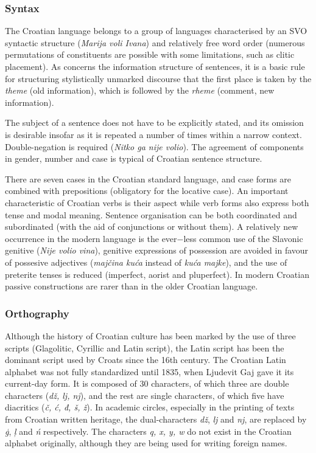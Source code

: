 \begin{multicols}{2}
\subsubsection{Syntax}

The Croatian language belongs to a group of languages characterised by an SVO syntactic structure (\emph{Marija voli Ivana}) and relatively free word order (numerous permutations of constituents are possible with some limitations, such as clitic placement). As concerns the information structure of sentences, it is a basic rule for structuring stylistically unmarked discourse that the first place is taken by the \emph{theme} (old information), which is followed by the \emph{rheme} (comment, new information).

The subject of a sentence does not have to be explicitly stated, and its omission is desirable insofar as it is repeated a number of times within a narrow context. Double-negation is required (\emph{Nitko ga nije volio}). The agreement of components in gender, number and case is typical of Croatian sentence structure.

There are seven cases in the Croatian standard language, and case forms are combined with prepositions (obligatory for the locative case). An important characteristic of Croatian verbs is their aspect while verb forms also express both tense and modal meaning. Sentence organisation can be both coordinated and subordinated (with the aid of conjunctions or without them). A relatively new occurrence in the modern language is the ever$-$less common use of the Slavonic genitive (\emph{Nije volio vina}), genitive expressions of possession are avoided in favour of possesive adjectives (\emph{majčina kuća} instead of \emph{kuća majke}), and the use of preterite tenses is reduced (imperfect, aorist and pluperfect). In modern Croatian passive constructions are rarer than in the older Croatian language.

\subsubsection{Orthography}

Although the history of Croatian culture has been marked by the use of three scripts (Glagolitic, Cyrillic and Latin script), the Latin script has been the dominant script used by Croats since the 16th century. The Croatian Latin alphabet was not fully standardized until 1835, when Ljudevit Gaj gave it its current-day form. It is composed of 30 characters, of which three are double characters (\emph{dž, lj, nj}), and the rest are single characters, of which five have diacritics (\emph{č, ć, đ, š, ž}). In academic circles, especially in the printing of texts from Croatian written heritage, the dual-characters \emph{dž}, \emph{lj} and \emph{nj}, are replaced by \emph{ģ}, \emph{ļ} and \emph{ń} respectively. The characters \emph{q, x, y, w} do not exist in the Croatian alphabet originally, although they are being used for writing foreign names.


\end{multicols}
